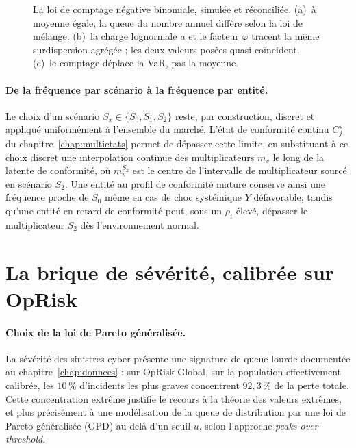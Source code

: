 \begin{figure}[htbp]\centering
{}
\caption{La loi de comptage négative binomiale, simulée et réconciliée. (a)~à moyenne égale,
la queue du nombre annuel diffère selon la loi de mélange. (b)~la charge lognormale $a$ et le
facteur $\varphi$ tracent la même surdispersion agrégée ; les deux valeurs posées quasi
coïncident. (c)~le comptage déplace la VaR, pas la moyenne.}
\label{soc:fig:nb}
\end{figure}

\paragraph{De la fréquence par scénario à la fréquence par entité.} Le choix
d'un scénario $S_x \in \{S_0, S_1, S_2\}$ reste, par construction, discret et
appliqué uniformément à l'ensemble du marché. L'état de conformité continu
$C^\star_j$ du chapitre~\ref{chap:multietats} permet de dépasser cette
limite, en substituant à ce choix discret une interpolation continue des multiplicateurs
$m_v$ le long de la latente de conformité,
où $\bar{m}_v^{S_2}$ est le centre de l'intervalle de multiplicateur sourcé
en scénario $S_2$. Une entité au profil de conformité mature conserve ainsi
une fréquence proche de $S_0$ même en cas de choc systémique $Y$
défavorable, tandis qu'une entité en retard de conformité peut, sous un
$\rho_i$ élevé, dépasser le multiplicateur $S_2$ dès l'environnement normal.



\section{La brique de sévérité, calibrée sur OpRisk}
\label{soc:sec:severite}


\paragraph{Choix de la loi de Pareto généralisée.} La sévérité des sinistres
cyber présente une signature de queue lourde documentée au chapitre~\ref{chap:donnees} : sur
OpRisk Global, sur la population effectivement calibrée, les $10\,\%$ d'incidents les plus
graves concentrent $92{,}3\,\%$
de la perte totale. Cette concentration extrême justifie le recours à la
théorie des valeurs extrêmes, et plus précisément à une modélisation de la
queue de distribution par une loi de Pareto généralisée (GPD) au-delà d'un
seuil $u$, selon l'approche \emph{peaks-over-threshold}.

